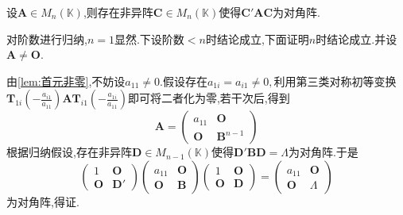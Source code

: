 \begin{formal}
    \begin{theorem}[必定合同于对角阵]\label{thm:必定合同于对角阵}
        设$\bm{A}\in M_n\left(\mathbb{K}\right)$,则存在非异阵$\bm{C}\in M_n\left(\mathbb{K}\right)$使得$\bm{C}'\bm{AC}$为对角阵.
    \end{theorem}
    \begin{Proof}
        对阶数进行归纳,$n=1$显然.下设阶数$<n$时结论成立,下面证明$n$时结论成立.并设$\bm{A}\neq\bm{O}$.

        由\cref{lem:首元非零},不妨设$a_{11}\neq 0.$假设存在$a_{1i}=a_{i1}\neq 0,$利用第三类对称初等变换$\displaystyle \bm{T}_{1i}\left(
            -\frac{a_{i1}}{a_{11}}
        \right)\bm{AT}_{i1}\left(
            -\frac{a_{1i}}{a_{11}}
        \right)$即可将二者化为零,若干次后,得到\[
        \bm{A}=\begin{pmatrix}
            a_{11}&\bm{O}\\
            \bm{O}&\bm{B}^{n-1}
        \end{pmatrix}
        \]根据归纳假设,存在非异阵$\bm{D}\in M_{n-1}\left(\mathbb{K}\right)$使得$\bm{D}'\bm{BD}=\bm{\varLambda}$为对角阵.于是\[
        \begin{pmatrix}
            1&\bm{O}\\
            \bm{O}&\bm{D}'
        \end{pmatrix}\begin{pmatrix}
            a_{11}&\bm{O}\\
            \bm{O}&\bm{B}
        \end{pmatrix}\begin{pmatrix}
            1&\bm{O}\\
            \bm{O}&\bm{D}
        \end{pmatrix}=\begin{pmatrix}
            a_{11}&\bm{O}\\
            \bm{O}&\bm{\varLambda}
        \end{pmatrix}
        \]为对角阵,得证.
    \end{Proof}
\end{formal}
